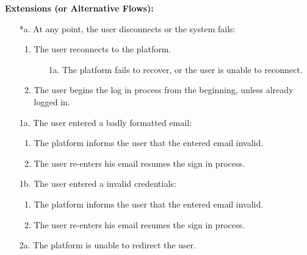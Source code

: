 \begin{itemize}[label={[\textbf{UC}]}, align=left, leftmargin=*]
    \textbf{Extensions (or Alternative Flows):} 
    \begin{enumerate}[label=\arabic*.]
        \item[*a.] At any point, the user disconnects or the system fails:
            \begin{enumerate}[label=\arabic*.]
                \item The user reconnects to the platform.
                    \begin{enumerate}[label=\alph*.]
                        \item[1a.] The platform fails to recover, or the user is unable to reconnect.
                    \end{enumerate}
                 \item The user begins the log in process from the beginning, unless already logged in.
            \end{enumerate}
        \item[1a.] The user entered a badly formatted email:
            \begin{enumerate}[label=\arabic*.]
                \item The platform informs the user that the entered email invalid.
                \item The user re-enters his email resumes the sign in process.
            \end{enumerate}
        \item[1b.] The user entered a invalid credentials:
            \begin{enumerate}[label=\arabic*.]
                \item The platform informs the user that the entered email invalid.
                \item The user re-enters his email resumes the sign in process.
            \end{enumerate}
        \item[2a.] The platform is unable to redirect the user.
        \end{enumerate}


\end{itemize}
